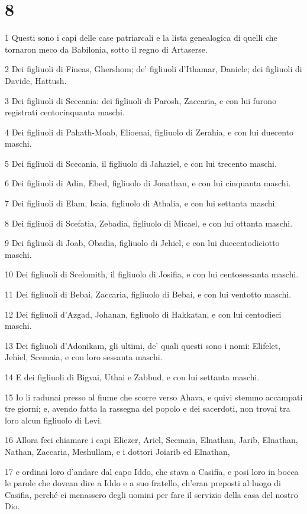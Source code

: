 \chapter{8}

\par 1 Questi sono i capi delle case patriarcali e la lista genealogica di quelli che tornaron meco da Babilonia, sotto il regno di Artaserse.
\par 2 Dei figliuoli di Fineas, Ghershom; de' figliuoli d'Ithamar, Daniele; dei figliuoli di Davide, Hattush.
\par 3 Dei figliuoli di Scecania: dei figliuoli di Parosh, Zaccaria, e con lui furono registrati centocinquanta maschi.
\par 4 Dei figliuoli di Pahath-Moab, Elioenai, figliuolo di Zerahia, e con lui duecento maschi.
\par 5 Dei figliuoli di Scecania, il figliuolo di Jahaziel, e con lui trecento maschi.
\par 6 Dei figliuoli di Adin, Ebed, figliuolo di Jonathan, e con lui cinquanta maschi.
\par 7 Dei figliuoli di Elam, Isaia, figliuolo di Athalia, e con lui settanta maschi.
\par 8 Dei figliuoli di Scefatia, Zebadia, figliuolo di Micael, e con lui ottanta maschi.
\par 9 Dei figliuoli di Joab, Obadia, figliuolo di Jehiel, e con lui duecentodiciotto maschi.
\par 10 Dei figliuoli di Scelomith, il figliuolo di Josifia, e con lui centosessanta maschi.
\par 11 Dei figliuoli di Bebai, Zaccaria, figliuolo di Bebai, e con lui ventotto maschi.
\par 12 Dei figliuoli d'Azgad, Johanan, figliuolo di Hakkatan, e con lui centodieci maschi.
\par 13 Dei figliuoli d'Adonikam, gli ultimi, de' quali questi sono i nomi: Elifelet, Jehiel, Scemaia, e con loro sessanta maschi.
\par 14 E dei figliuoli di Bigvai, Uthai e Zabbud, e con lui settanta maschi.
\par 15 Io li radunai presso al fiume che scorre verso Ahava, e quivi stemmo accampati tre giorni; e, avendo fatta la rassegna del popolo e dei sacerdoti, non trovai tra loro alcun figliuolo di Levi.
\par 16 Allora feci chiamare i capi Eliezer, Ariel, Scemaia, Elnathan, Jarib, Elnathan, Nathan, Zaccaria, Meshullam, e i dottori Joiarib ed Elnathan,
\par 17 e ordinai loro d'andare dal capo Iddo, che stava a Casifia, e posi loro in bocca le parole che dovean dire a Iddo e a suo fratello, ch'eran preposti al luogo di Casifia, perché ci menassero degli uomini per fare il servizio della casa del nostro Dio.
